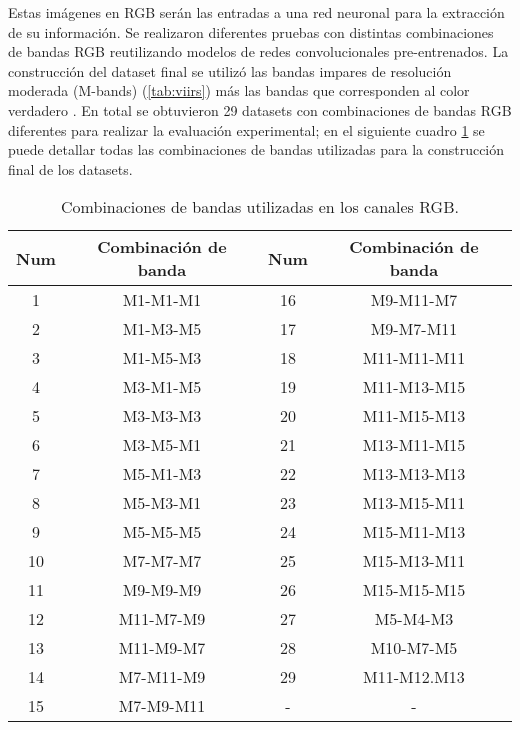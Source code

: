 Estas imágenes en RGB serán las entradas a una red neuronal para la extracción de su información. Se realizaron diferentes pruebas con distintas combinaciones de bandas RGB reutilizando modelos de redes convolucionales pre-entrenados. La construcción del dataset final se utilizó las bandas impares de resolución moderada (M-bands) (\ref{tab:viirs})  más las bandas que corresponden al color verdadero . En total se obtuvieron 29 datasets con combinaciones de bandas RGB diferentes para realizar la evaluación experimental; en el siguiente cuadro  \ref{tab:combinacion_banda} se puede detallar todas las combinaciones de bandas utilizadas para la construcción final de los datasets.


\begin{table}[h] \begin{center}
\begin{tabular}{|c|c||c|c|}\hline 
\textbf{Num} & \textbf{Combinación de banda} & \textbf{Num} & \textbf{Combinación de banda} \\ \hline 
1  	& 	M1-M1-M1 			& 16  & 	M9-M11-M7  \\ \hline
2  	&   M1-M3-M5			& 17  & 	M9-M7-M11\\  \hline
3  	& 	M1-M5-M3			& 18  & 	M11-M11-M11\\ \hline
4  	&   M3-M1-M5 			& 19  & 	M11-M13-M15\\ \hline
5   & 	M3-M3-M3 			& 20  & 	M11-M15-M13\\ \hline
6   & 	M3-M5-M1 			& 21  & 	M13-M11-M15 \\ \hline
7   & 	M5-M1-M3 			& 22  & 	M13-M13-M13\\ \hline
8   & 	M5-M3-M1 			& 23  & 	M13-M15-M11\\ \hline
9   &   M5-M5-M5  			& 24  & 	M15-M11-M13\\ \hline
10  &	M7-M7-M7   			& 25  & 	M15-M13-M11\\ \hline
11  & 	M9-M9-M9   			& 26  & 	M15-M15-M15\\ \hline
12  & 	M11-M7-M9  			& 27  & 	M5-M4-M3\\ \hline
13  & 	M11-M9-M7  			& 28  & 	M10-M7-M5\\ \hline
14  &  	M7-M11-M9  			& 29  & 	M11-M12.M13\\ \hline
15  & 	M7-M9-M11  			& -& -\\ \hline      	
\end{tabular}
\end{center}\caption{Combinaciones de bandas utilizadas en los canales RGB. \label{tab:combinacion_banda}}
\end{table}


